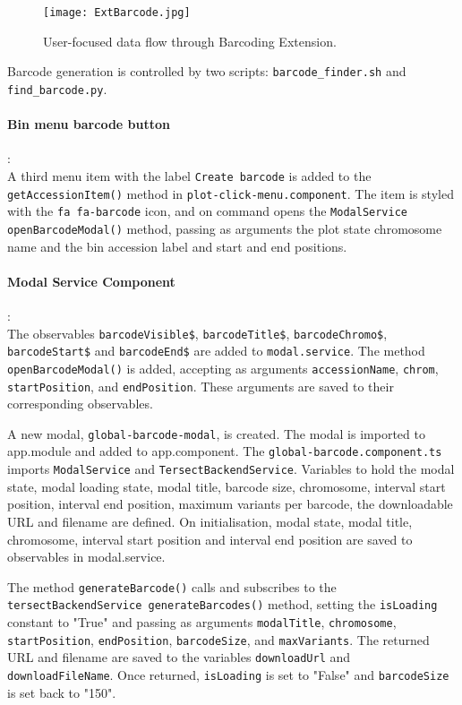 \documentclass[12pt]{article}
\begin{document}
\begin{itemize}
\begin{figure}[h]
    \centering
    \texttt{[image: ExtBarcode.jpg]}
    \caption{User-focused data flow through Barcoding Extension.}
\end{figure}

Barcode generation is controlled by two scripts: \verb+barcode_finder.sh+ and \verb+find_barcode.py+. 

\paragraph{Bin menu barcode button}:\\
A third menu item with the label \verb+Create barcode+ is added to the \verb+getAccessionItem()+ method in \verb+plot-click-menu.component+. The item is styled with the \verb+fa fa-barcode+ icon, and on command opens the \verb+ModalService openBarcodeModal()+ method, passing as arguments the plot state chromosome name and the bin accession label and start and end positions.

\paragraph{Modal Service Component}:\\
The observables \verb+barcodeVisible$+, \verb+barcodeTitle$+, \verb+barcodeChromo$+, \verb+barcodeStart$+ and \verb+barcodeEnd$+ are added to \verb+modal.service+. The method \verb+openBarcodeModal()+ is added, accepting as arguments \verb+accessionName+, \verb+chrom+, \verb+startPosition+, and \verb+endPosition+. These arguments are saved to their corresponding observables.  

A new modal, \verb+global-barcode-modal+, is created. The modal is imported to app.module and added to app.component. The \verb+global-barcode.component.ts+ imports \verb+ModalService+ and \verb+TersectBackendService+. Variables to hold the modal state, modal loading state, modal title, barcode size, chromosome, interval start position, interval end position, maximum variants per barcode, the downloadable URL and filename are defined. On initialisation, modal state, modal title, chromosome, interval start position and interval end position are saved to observables in modal.service. 

The method \verb+generateBarcode()+ calls and subscribes to the \verb+tersectBackendService generateBarcodes()+ method, setting the \verb+isLoading+ constant to "True" and passing as arguments \verb+modalTitle+, \verb+chromosome+, \verb+startPosition+, \verb+endPosition+, \verb+barcodeSize+, and \verb+maxVariants+. The returned URL and filename are saved to the variables \verb+downloadUrl+ and \verb+downloadFileName+. Once returned, \verb+isLoading+ is set to "False" and \verb+barcodeSize+ is set back to "150". 


\end{itemize}
\end{document}
